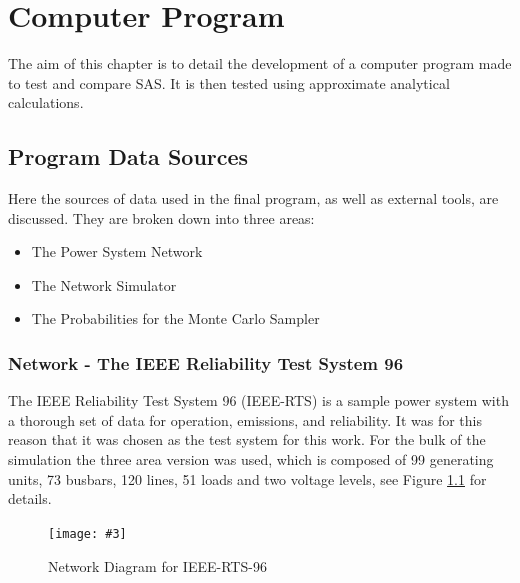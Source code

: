 \documentclass[a4paper,oneside,12pt]{report}
\newcommand{\image}[3] {
  \begin{figure}
    \begin{center}
      \texttt{[image: \#3]}
      \caption{#2}
      \label{#1}
    \end{center}
  \end{figure}
}
\begin{document}









\chapter{Computer Program}

The aim of this chapter is to detail the development of a computer program made to test and compare SAS. It is then tested using approximate analytical calculations.

\section{Program Data Sources}

Here the sources of data used in the final program, as well as external tools, are discussed. They are broken down into three areas:

\begin{itemize}
\item The Power System Network
\item The Network Simulator
\item The Probabilities for the Monte Carlo Sampler
\end{itemize}

\subsection{Network - The IEEE Reliability Test System 96\label{lbl_RTS}}

The IEEE Reliability Test System 96 (IEEE-RTS) \cite{Grigg1999} is a sample power system with a thorough set of data for operation, emissions, and reliability. It was for this reason that it was chosen as the test system for this work. For the bulk of the simulation the three area version was used, which is composed of 99 generating units, 73 busbars, 120 lines, 51 loads and two voltage levels, see Figure \ref{rts96} for details.

\image{rts96}{Network Diagram for IEEE-RTS-96}{rts96.png}
\end{document}
